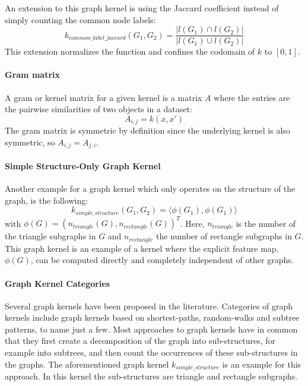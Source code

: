 An extension to this graph kernel is using the Jaccard coefficient instead of simply counting the common node labels:
\begin{equation*}
k_{common\_label\_jaccard}(G_1, G_2) = \frac{| l(G_1) \cap l(G_2) |}{| l(G_1) \cup l(G_2) |}
\end{equation*}
This extension normalizes the function and confines the codomain of $k$ to $[0, 1]$.

\paragraph{Gram matrix}
A gram or kernel matrix for a given kernel is a matrix $A$ where the entries are the pairwise similarities of two objects in a dataset:
\begin{equation*}
    A_{i,j} = k(x, x')
\end{equation*}
The gram matrix is symmetric by definition since the underlying kernel is also symmetric, so $A_{i,j} = A_{j, i}$.

\paragraph{Simple Structure-Only Graph Kernel}
Another example for a graph kernel which only operates on the structure of the graph, is the following:
\begin{equation*}
k_{simple\_structure}(G_1, G_2) = \langle \phi(G_1), \phi(G_1) \rangle
\end{equation*}
with $\phi(G) = (n_{triangle}(G), n_{rectangle}(G))^T$. Here, $n_{triangle}$ is the number of the triangle subgraphs in $G$ and $n_{rectangle}$ the number of rectangle subgraphs in $G$.
This graph kernel is an example of a kernel where the explicit feature map, $\phi(G)$, can be computed directly and completely independent of other graphs.


\paragraph{Graph Kernel Categories}
Several graph kernels have been proposed in the literature.
Categories of graph kernels include graph kernels based on shortest-paths, random-walks and subtree patterns, to name just a few.
Most approaches to graph kernels have in common that they first create a decomposition of the graph into sub-structures, for example into subtrees, and then count the occurrences of these sub-structures in the graphs. The aforementioned graph kernel $k_{simple\_structure}$ is an example for this approach. In this kernel the sub-structures are triangle and rectangle subgraphs.

